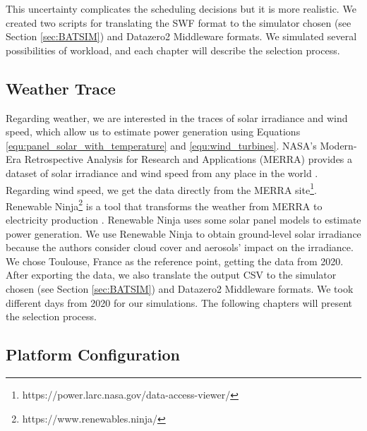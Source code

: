This uncertainty complicates the scheduling decisions but it is more realistic. We created two scripts for translating the SWF format to the simulator chosen (see Section \ref{sec:BATSIM}) and Datazero2 Middleware formats. We simulated several possibilities of workload, and each chapter will describe the selection process.

\subsection{Weather Trace}
\label{sec:weather_trace}

Regarding weather, we are interested in the traces of solar irradiance and wind speed, which allow us to estimate power generation using Equations \ref{equ:panel_solar_with_temperature} and \ref{equ:wind_turbines}. NASA's Modern-Era Retrospective Analysis for Research and Applications (MERRA) provides a dataset of solar irradiance and wind speed from any place in the world \cite{rienecker2011merra}. Regarding wind speed, we get the data directly from the MERRA site\footnote{https://power.larc.nasa.gov/data-access-viewer/}. Renewable Ninja\footnote{https://www.renewables.ninja/} is a tool that transforms the weather from MERRA to electricity production \cite{pfenninger2016long, staffell2016using}. Renewable Ninja uses some solar panel models to estimate power generation. We use Renewable Ninja to obtain ground-level solar irradiance because the authors consider cloud cover and aerosols' impact on the irradiance. We chose Toulouse, France as the reference point, getting the data from 2020. After exporting the data, we also translate the output CSV to the simulator chosen (see Section \ref{sec:BATSIM}) and Datazero2 Middleware formats. We took different days from 2020 for our simulations. The following chapters will present the selection process.

\subsection{Platform Configuration}
\label{sec:platform_configuration}

